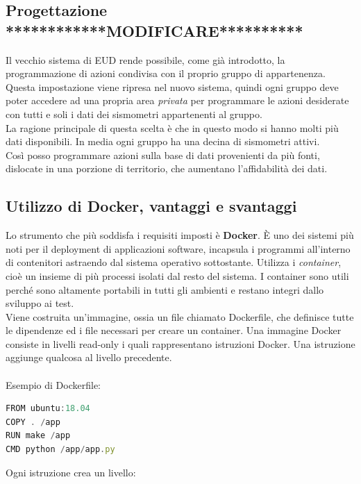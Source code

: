 \documentclass[a4paper,10pt]{memoir}
\begin{document}
\subsection{Progettazione ************MODIFICARE**********}
Il vecchio sistema di EUD rende possibile, come già introdotto, la programmazione di azioni condivisa con il proprio gruppo di appartenenza.
\\
Questa impostazione viene ripresa nel nuovo sistema, quindi ogni gruppo deve poter accedere ad una propria area \textit{privata} per programmare le azioni desiderate con tutti e soli i dati dei sismometri appartenenti al gruppo.
\\
La ragione principale di questa scelta è che in questo modo si hanno molti più dati disponibili. In media ogni gruppo ha una decina di sismometri attivi.
\\
Così posso programmare azioni sulla base di dati provenienti da più fonti, dislocate in una porzione di territorio, che aumentano l'affidabilità dei dati.

\clearpage

\subsection{Utilizzo di Docker, vantaggi e svantaggi}

Lo strumento che più soddisfa i requisiti imposti è \textbf{Docker}.
È uno dei sistemi più noti per il deployment di applicazioni software, incapsula i programmi all'interno di contenitori astraendo dal sistema operativo sottostante.
Utilizza i \textit{container}, cioè un insieme di più processi isolati dal resto del sistema.
I container sono utili perché sono altamente portabili in tutti gli ambienti e restano integri dallo sviluppo ai test.
\\
Viene costruita un'immagine, ossia un file chiamato Dockerfile, che definisce tutte le dipendenze ed i file necessari per creare un container.
Una immagine Docker consiste in livelli read-only i quali rappresentano istruzioni Docker. Una istruzione aggiunge qualcosa al livello precedente.
\\
\\
Esempio di Dockerfile:
\begin{lstlisting}[language=Javascript]
FROM ubuntu:18.04
COPY . /app
RUN make /app
CMD python /app/app.py
\end{lstlisting}

Ogni istruzione crea un livello:
\end{document}
